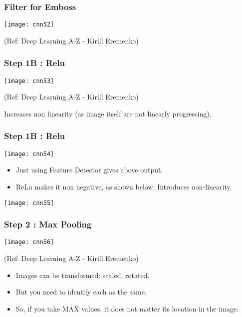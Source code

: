 \begin{frame}[fragile] \frametitle{Filter for Emboss}

\begin{center}
\texttt{[image: cnn52]}

\tiny{(Ref: Deep Learning A-Z - Kirill Eremenko)}
\end{center}

\end{frame}

\begin{frame}[fragile] \frametitle{Step 1B : Relu}

\begin{center}
\texttt{[image: cnn53]}

\tiny{(Ref: Deep Learning A-Z - Kirill Eremenko)}
\end{center}

 Increases non linearity (as image itself are not linearly progressing).


\end{frame}


\begin{frame}[fragile] \frametitle{Step 1B : Relu}

\begin{center}
\texttt{[image: cnn54]}
\end{center}

\begin{itemize}
\item Just using Feature Detector gives above output.
\item ReLu makes it non negative, as shown below. Introduces non-linearity.
\end{itemize}


\begin{center}
\texttt{[image: cnn55]}
\end{center}
\end{frame}

\begin{frame}[fragile] \frametitle{Step 2 : Max Pooling}

\begin{center}
\texttt{[image: cnn56]}

\tiny{(Ref: Deep Learning A-Z - Kirill Eremenko)}
\end{center}

\begin{itemize}
\item Images can be transformed: scaled, rotated.
\item But you need to identify each as the same.
\item So, if you take MAX values, it does not matter its location in the image.
\end{itemize}

\end{frame}


